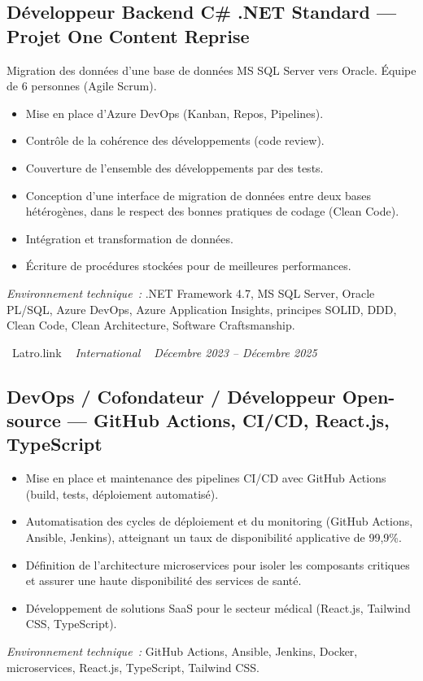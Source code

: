 \documentclass[10pt,a4paper]{article}
\begin{document}
\vspace{6pt}

\subsection*{Développeur Backend C\# .NET Standard --- Projet One Content Reprise}
\color{darkgray}
Migration des données d'une base de données MS SQL Server vers Oracle. Équipe de 6 personnes (Agile Scrum).
\begin{itemize}
  \item Mise en place d'Azure DevOps (Kanban, Repos, Pipelines).
  \item Contrôle de la cohérence des développements (code review).
  \item Couverture de l'ensemble des développements par des tests.
  \item Conception d'une interface de migration de données entre deux bases hétérogènes, dans le respect des bonnes pratiques de codage (Clean Code).
  \item Intégration et transformation de données.
  \item Écriture de procédures stockées pour de meilleures performances.
\end{itemize}
\textit{Environnement technique~:} .NET Framework 4.7, MS SQL Server, Oracle PL/SQL, Azure DevOps, Azure Application Insights, principes SOLID, DDD, Clean Code, Clean Architecture, Software Craftsmanship.

\vspace{10pt}

\noindent\textcolor{primary}{ \faBuilding\ Latro.link} \quad
\textit{ \small \textcolor{darkgray}{ \faMapMarker\ } International } \hfill
\textit{ \small \textcolor{darkgray}{ \faCalendar\ } Décembre 2023 -- Décembre 2025 }

\vspace{4pt}

\subsection*{DevOps / Cofondateur / Développeur Open-source --- GitHub Actions, CI/CD, React.js, TypeScript}
\color{darkgray}
\begin{itemize}
  \item Mise en place et maintenance des pipelines CI/CD avec GitHub Actions (build, tests, déploiement automatisé).
  \item Automatisation des cycles de déploiement et du monitoring (GitHub Actions, Ansible, Jenkins), atteignant un taux de disponibilité applicative de 99,9\%.
  \item Définition de l'architecture microservices pour isoler les composants critiques et assurer une haute disponibilité des services de santé.
  \item Développement de solutions SaaS pour le secteur médical (React.js, Tailwind CSS, TypeScript).
\end{itemize}
\textit{Environnement technique~:} GitHub Actions, Ansible, Jenkins, Docker, microservices, React.js, TypeScript, Tailwind CSS.
\end{document}
